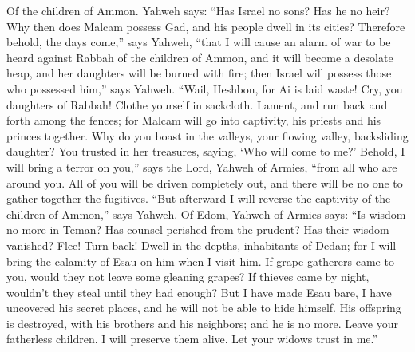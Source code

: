  Of the children of Ammon. Yahweh says: ``Has Israel no
sons? Has he no heir? Why then does Malcam possess Gad, and his people
dwell in its cities?  Therefore behold, the days come,''
says Yahweh, ``that I will cause an alarm of war to be heard against
Rabbah of the children of Ammon, and it will become a desolate heap, and
her daughters will be burned with fire; then Israel will possess those
who possessed him,'' says Yahweh.  ``Wail, Heshbon, for Ai
is laid waste! Cry, you daughters of Rabbah! Clothe yourself in
sackcloth. Lament, and run back and forth among the fences; for Malcam
will go into captivity, his priests and his princes together.
 Why do you boast in the valleys, your flowing valley,
backsliding daughter? You trusted in her treasures, saying, `Who will
come to me?'  Behold, I will bring a terror on you,'' says
the Lord, Yahweh of Armies, ``from all who are around you. All of you
will be driven completely out, and there will be no one to gather
together the fugitives.  ``But afterward I will reverse the
captivity of the children of Ammon,'' says Yahweh.  Of Edom,
Yahweh of Armies says: ``Is wisdom no more in Teman? Has counsel
perished from the prudent? Has their wisdom vanished?  Flee!
Turn back! Dwell in the depths, inhabitants of Dedan; for I will bring
the calamity of Esau on him when I visit him.  If grape
gatherers came to you, would they not leave some gleaning grapes? If
thieves came by night, wouldn't they steal until they had enough?
 But I have made Esau bare, I have uncovered his secret
places, and he will not be able to hide himself. His offspring is
destroyed, with his brothers and his neighbors; and he is no more.
 Leave your fatherless children. I will preserve them
alive. Let your widows trust in me.''

